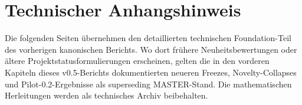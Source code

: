 \section*{Technischer Anhangshinweis}
Die folgenden Seiten übernehmen den detaillierten technischen Foundation-Teil des vorherigen kanonischen Berichts. Wo dort frühere Neuheitsbewertungen oder ältere Projektstatusformulierungen erscheinen, gelten die in den vorderen Kapiteln dieses v0.5-Berichts dokumentierten neueren Freezes, Novelty-Collapses und Pilot-0.2-Ergebnisse als superseding MASTER-Stand. Die mathematischen Herleitungen werden als technisches Archiv beibehalten.
